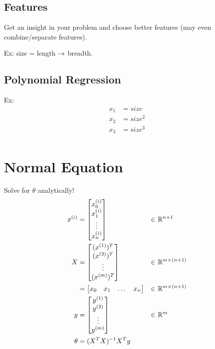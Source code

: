 \subsection{Features}
Get an insight in your problem and choose better features (may even combine/separate features).

Ex: size = length $\rightarrow$ breadth.

\subsection{Polynomial Regression}
Ex: \begin{align*}
    x_1 & = size   \\
    x_2 & = size^2 \\
    x_3 & = size^3 \\
\end{align*}

\section{Normal Equation}
Solve for $\theta$ analytically!
\begin{align*}
    x^{(i)} & = \begin{bmatrix}
        x_0^{(i)} \\
        x_1^{(i)} \\
        \vdots    \\
        x_n^{(i)} \\
    \end{bmatrix} & \in & \ \mathbb{R}^{n+1}            \\
    X       & = \begin{bmatrix}
        (x^{(1)})^T \\
        (x^{(2)})^T \\
        \vdots      \\
        (x^{(m)})^T \\
    \end{bmatrix} & \in & \ \mathbb{R}^{m \times (n+1)} \\
            & = \begin{bmatrix}
        x_0 & x_1 & \dots & x_n \\
    \end{bmatrix} & \in & \ \mathbb{R}^{m \times (n+1)} \\
    y       & = \begin{bmatrix}
        y^{(1)} \\
        y^{(2)} \\
        \vdots  \\
        y^{(m)} \\
    \end{bmatrix} & \in & \ \mathbb{R}^m                \\
    \theta  & = (X^TX)^{-1}X^Ty                                          \\
\end{align*}

